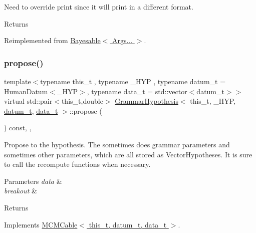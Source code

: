 Need to override print since it will print in a different format. 

\begin{DoxyReturn}{Returns}

\end{DoxyReturn}


Reimplemented from \hyperlink{class_bayesable_a87d5d9481d6a72b017e44b175071fa5e}{Bayesable$<$ Args... $>$}.

\mbox{\label{class_grammar_hypothesis_a8e6d781ab5fa0a6656b09b607a906735}} 
\subsubsection{\texorpdfstring{propose()}{propose()}}
{\footnotesize\ttfamily template$<$typename this\+\_\+t , typename \+\_\+\+H\+YP , typename datum\+\_\+t  = Human\+Datum$<$\+\_\+\+H\+Y\+P$>$, typename data\+\_\+t  = std\+::vector$<$datum\+\_\+t$>$$>$ \\
virtual std\+::pair$<$this\+\_\+t,double$>$ \hyperlink{class_grammar_hypothesis}{Grammar\+Hypothesis}$<$ this\+\_\+t, \+\_\+\+H\+YP, \hyperlink{class_bayesable_a9f1a6c0cd7855550fa10b1a8f13a5867}{datum\+\_\+t}, \hyperlink{class_bayesable_aa2788c4d7718c0a824e1d28c4c98f921}{data\+\_\+t} $>$\+::propose (\begin{DoxyParamCaption}{ }\end{DoxyParamCaption}) const\hspace{0.3cm}{\ttfamily [inline]}, {\ttfamily [override]}, {\ttfamily [virtual]}}



Propose to the hypothesis. The sometimes does grammar parameters and sometimes other parameters, which are all stored as Vector\+Hypotheses. It is sure to call the recompute functions when necessary. 


\begin{DoxyParams}{Parameters}
{\em data} & \\
\hline
{\em breakout} & \\
\hline
\end{DoxyParams}
\begin{DoxyReturn}{Returns}

\end{DoxyReturn}


Implements \hyperlink{class_m_c_m_cable_a98b52f1867ea0d72c1c91b4496d756d2}{M\+C\+M\+Cable$<$ this\+\_\+t, datum\+\_\+t, data\+\_\+t $>$}.

